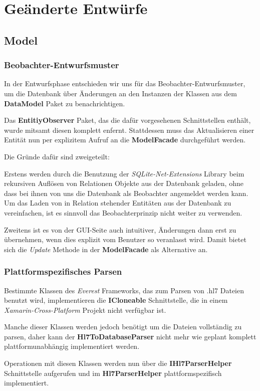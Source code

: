 \documentclass[a4paper]{scrreprt}
\begin{document}
\section{Geänderte Entwürfe}
\subsection{Model}
\subsubsection{Beobachter-Entwurfsmuster}
In der Entwurfsphase entschieden wir uns für das Beobachter-Entwurfsmuster, um die Datenbank über Änderungen an den Instanzen der Klassen aus dem \textbf{DataModel} Paket zu benachrichtigen.

Das \textbf{EntitiyObserver} Paket, das die dafür vorgesehenen Schnittstellen enthält, wurde mitsamt diesen komplett enfernt. Stattdessen muss das Aktualisieren einer Entität nun per explizitem Aufruf an die \textbf{ModelFacade} durchgeführt werden.

Die Gründe dafür sind zweigeteilt:

Erstens werden durch die Benutzung der \textit{SQLite-Net-Extensions} Library beim rekursiven Auflösen von Relationen Objekte aus der Datenbank geladen, ohne dass bei ihnen von uns die Datenbank als Beobachter angemeldet werden kann. Um das Laden von in Relation stehender Entitäten aus der Datenbank zu vereinfachen, ist es sinnvoll das Beobachterprinzip nicht weiter zu verwenden.

Zweitens ist es von der GUI-Seite auch intuitiver, Änderungen dann erst zu übernehmen, wenn dies explizit vom Benutzer so veranlasst wird. Damit bietet sich die \textit{Update} Methode in der \textbf{ModelFacade} als Alternative an.

\subsubsection{Plattformspezifisches Parsen}
Bestimmte Klassen des \textit{Everest} Frameworks, das zum Parsen von .hl7 Dateien benutzt wird, implementieren die \textbf{ICloneable} Schnittstelle, die in einem \textit{Xamarin-Cross-Platform} Projekt nicht verfügbar ist. 

Manche dieser Klassen werden jedoch benötigt um die Dateien vollständig zu parsen, daher kann der \textbf{Hl7ToDatabaseParser} nicht mehr wie geplant komplett plattformunabhängig implementiert werden.

Operationen mit diesen Klassen werden nun über die \textbf{IHl7ParserHelper} Schnittstelle aufgerufen und im \textbf{Hl7ParserHelper} plattformspezifisch implementiert.
\end{document}

